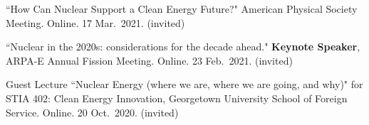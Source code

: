 \begin{bibsection}



\item ``How Can Nuclear Support a Clean Energy Future?"  American Physical Society Meeting. Online. 17 Mar.\ 2021. (invited)

\item ``Nuclear in the 2020s: considerations for the decade ahead." \textbf{Keynote Speaker}, ARPA-E Annual Fission Meeting. Online. 23 Feb.\ 2021. (invited)

\item Guest Lecture ``Nuclear Energy (where we are, where we are going, and why)" for STIA 402: Clean Energy Innovation, Georgetown University School of Foreign Service. Online. 20 Oct.\ 2020. (invited)








\end{bibsection}
